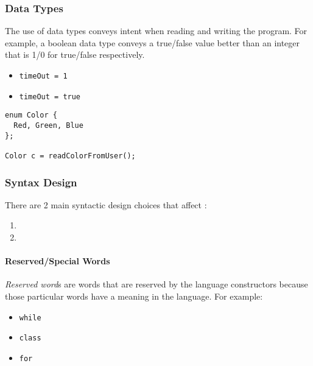 \subsubsection{Data Types}\label{subsubsec:Data_Types}
The use of data types conveys intent when reading and writing the program.
For example, a boolean data type conveys a true/false value better than an integer that is 1/0 for true/false respectively.
\begin{itemize}[noitemsep]
\item \texttt{timeOut = 1}
\item \texttt{timeOut = true}
\end{itemize}

\begin{verbatim}
enum Color {
  Red, Green, Blue
};

Color c = readColorFromUser();
\end{verbatim}

\subsubsection{Syntax Design}\label{subsubsec:Syntax_Design}
There are 2 main syntactic design choices that affect :
\begin{enumerate}[noitemsep]
\item {}
\item {}
\end{enumerate}

\paragraph{Reserved/Special Words}\label{par:Reserved_Words}
\begin{definition}\label{def:Reserved_Word}
  \emph{Reserved word}s are words that are reserved by the language constructors because those particular words have a meaning in the language.
  For example:
  \begin{itemize}[noitemsep]
  \item \texttt{while}
  \item \texttt{class}
  \item \texttt{for}
  \end{itemize}
\end{definition}

